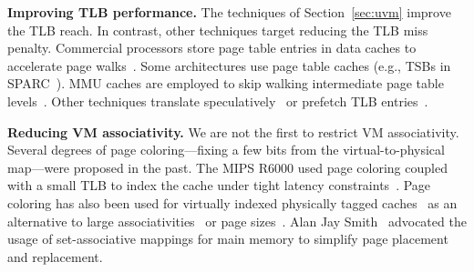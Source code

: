 


\noindent\textbf{Improving TLB performance.} The techniques of Section~\ref{sec:uvm} improve the TLB reach. In contrast, other techniques target reducing the TLB miss penalty. Commercial processors store page table entries in data caches to accelerate page walks~\cite{intel:architectures}. Some architectures use page table caches (e.g., TSBs in SPARC~\cite{sun:ultrasparc}). MMU caches are employed to skip walking intermediate page table levels~\cite{bhattacharjee:large-reach, barr:translation}. Other techniques translate speculatively~\cite{barr:spectlb} or prefetch TLB entries~\cite{bhattacharjee:characterizing}. 


\noindent\textbf{Reducing VM associativity.} We are not the first to restrict VM associativity. Several degrees of page coloring---fixing a few bits from the virtual-to-physical map---were proposed in the past. The MIPS R6000 used page coloring coupled with a small TLB to index the cache under tight latency constraints~\cite{taylor:tlb}. Page coloring has also been used for virtually indexed physically tagged caches~\cite{chiueh:eliminating} as an alternative to large associativities~\cite{gustafson:ibm} or page sizes~\cite{jouppi:architectural}. Alan Jay Smith~\cite{smith:comparative} advocated the usage of set-associative mappings for main memory to simplify page placement and replacement. 

